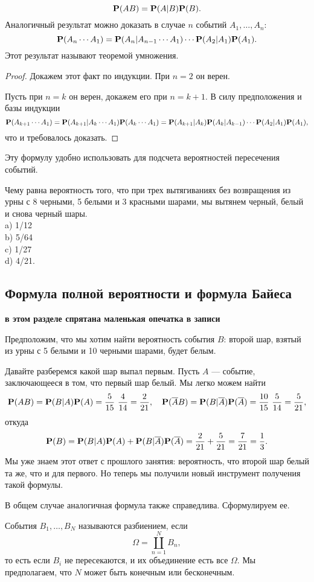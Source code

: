 \documentclass[11 pt,russian]{article}
\begin{document}
$$
{\bf P}(AB) = {\bf P}(A|B) {\bf P}(B).
$$
Аналогичный результат можно доказать в случае $n$ событий $A_1,\dotsc,A_n$:
$$
{\bf P}(A_n \dotsm A_1) = {\bf P}(A_n|A_{n-1}\dotsm A_1) \dotsm {\bf P}(A_2|A_1) {\bf P}(A_1).
$$
Этот результат называют теоремой умножения.
\begin{proof}
Докажем этот факт по индукции. При $n=2$ он верен. 

Пусть при $n=k$ он верен, докажем его при $n=k+1$. В силу предположения и базы индукции
$$
{\bf P}(A_{k+1}\dotsm A_1) = {\bf P}(A_{k+1}|A_k \dotsm A_1) {\bf P}(A_k \dotsm A_1) = {\bf P}(A_{k+1}|A_k) {\bf P}(A_k|A_{k-1}) \dotsm {\bf P}(A_2|A_1) {\bf P}(A_1),
$$
что и требовалось доказать.
\end{proof}
Эту формулу удобно использовать для подсчета вероятностей пересечения событий.
\begin{Que}
Чему равна вероятность того, что при трех вытягиваниях без возвращения из урны с 8 черными, 5 белыми и 3 красными шарами, мы вытянем черный, белый и снова черный шары.\\
a) 1/12\\
b) 5/64\\
c) 1/27\\
d) 4/21.
\end{Que}
\subsection{Формула полной вероятности и формула Байеса}
{\bf в этом разделе спрятана маленькая опечатка в записи}
\begin{Exam}
Предположим, что мы хотим найти вероятность события $B$: второй шар, взятый из урны с 5 белыми и 10 черными шарами, будет белым. 

Давайте разберемся какой шар выпал первым. Пусть $A$ --- событие, заключающееся в том, что первый шар белый. Мы легко можем найти
$$
{\bf P}(A B) = {\bf P}(B|A) {\bf P}(A) = \frac{5}{15}\ \frac{4}{14} = \frac{2}{21},\quad {\bf P}(\overline{A} B) = {\bf P}(B|\overline{A}) {\bf P}(\overline{A}) = \frac{10}{15}\ \frac{5}{14} = \frac{5}{21},
$$
откуда 
$$
{\bf P}(B) = {\bf P}(B|A) {\bf P}(A) + {\bf P}(B|\overline{A}) {\bf P}(\overline{A}) = \frac{2}{21} + \frac{5}{21} = \frac{7}{21}=\frac13.
$$
Мы уже знаем этот ответ с прошлого занятия: вероятность, что второй шар белый та же, что и для первого. Но теперь мы получили новый инструмент получения такой формулы.
\end{Exam}
В общем случае аналогичная формула также справедлива. Сформулируем ее.
\begin{Def}
События $B_1,\dotsc,B_N$ называются разбиением, если 
$$\Omega = \coprod_{n=1}^{N} B_n,$$
то есть если $B_i$ не пересекаются, и их объединение есть все $\Omega$. Мы предполагаем, что $N$ может быть конечным или бесконечным.
\end{Def}
\end{document}

